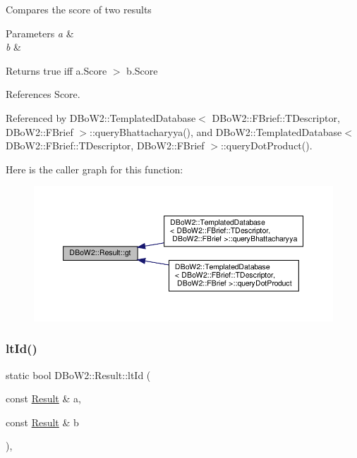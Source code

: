Compares the score of two results 
\begin{DoxyParams}{Parameters}
{\em a} & \\
\hline
{\em b} & \\
\hline
\end{DoxyParams}
\begin{DoxyReturn}{Returns}
true iff a.\+Score $>$ b.\+Score 
\end{DoxyReturn}


References Score.



Referenced by D\+Bo\+W2\+::\+Templated\+Database$<$ D\+Bo\+W2\+::\+F\+Brief\+::\+T\+Descriptor, D\+Bo\+W2\+::\+F\+Brief $>$\+::query\+Bhattacharyya(), and D\+Bo\+W2\+::\+Templated\+Database$<$ D\+Bo\+W2\+::\+F\+Brief\+::\+T\+Descriptor, D\+Bo\+W2\+::\+F\+Brief $>$\+::query\+Dot\+Product().

Here is the caller graph for this function\+:\nopagebreak
\begin{figure}[H]
\begin{center}
\leavevmode
\includegraphics[width=350pt]{classDBoW2_1_1Result_a6af72ce2de8c7e1707550520d9c7e422_icgraph}
\end{center}
\end{figure}
\mbox{\label{classDBoW2_1_1Result_ac8b4e2a21806b48a042168936c44e6bd}} 
\subsubsection{\texorpdfstring{lt\+Id()}{ltId()}}
{\footnotesize\ttfamily static bool D\+Bo\+W2\+::\+Result\+::lt\+Id (\begin{DoxyParamCaption}\item[{const \hyperlink{classDBoW2_1_1Result}{Result} \&}]{a,  }\item[{const \hyperlink{classDBoW2_1_1Result}{Result} \&}]{b }\end{DoxyParamCaption})\hspace{0.3cm}{\ttfamily [inline]}, {\ttfamily [static]}}

